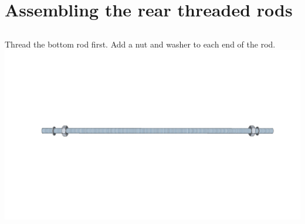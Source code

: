 \documentclass[twoside,openany,a4paper,titlepage]{memoir}
\begin{document}
	\chapter{Assembling the rear threaded rods}
	
	\section{}
	Thread the bottom rod first. Add a nut and washer to each end of the rod.\\
	\includegraphics[width=1\linewidth]{graphics/ch3_1.png}
	
\end{document}
